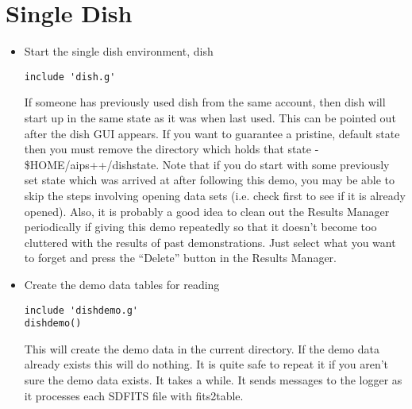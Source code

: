 \section{Single Dish}

\begin{itemize}
\item Start the single dish environment, dish
\begin{verbatim}
include 'dish.g'
\end{verbatim}
If someone has previously used dish from the same account, then dish
will start up in the same state as it was when last used.  This can
be pointed out after the dish GUI appears.  If you want to guarantee
a pristine, default state then you must remove the directory which
holds that state - \$HOME/aips++/dishstate.  Note that if you do start with
some previously set state which was arrived at after following this
demo, you may be able to skip the steps involving opening data sets
(i.e. check first to see if it is already opened).  Also, it is probably
a good idea to clean out the Results Manager periodically if giving
this demo repeatedly so that it doesn't become too cluttered with the
results of past demonstrations.  Just select what you want to forget
and press the ``Delete'' button in the Results Manager.
\item Create the demo data tables for reading
\begin{verbatim}
include 'dishdemo.g'
dishdemo()
\end{verbatim}
This will create the demo data in the current directory.  If the demo data 
already exists this will do nothing. It is quite safe to repeat it
if you aren't sure the demo data exists.  It takes a while.  It sends
messages to the logger as it processes each SDFITS file
with fits2table.


\end{itemize}
